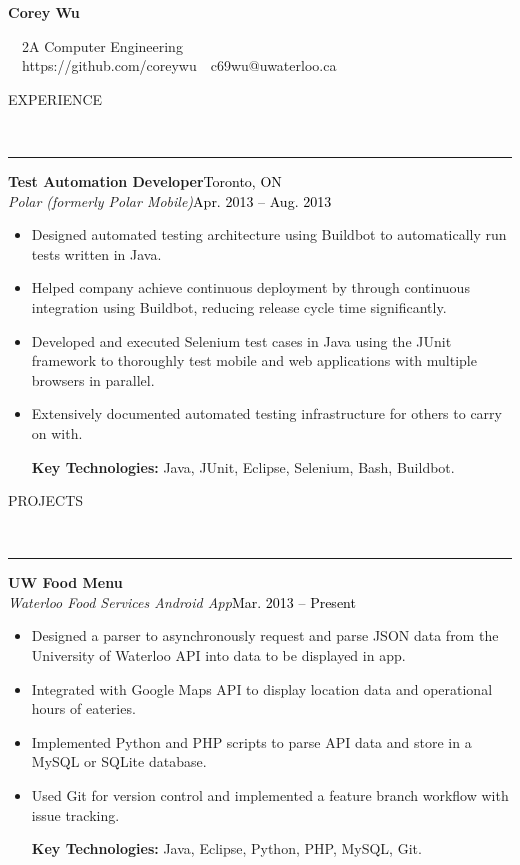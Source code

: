 \documentclass[11pt, letterpaper, oneside]{article}
\makeatletter
\newcommand{\name}{Corey Wu}
\newcommand{\program}{2A Computer Engineering}
\newcommand{\github}{https://github.com/coreywu}
\newcommand{\email}{c69wu@uwaterloo.ca}
\newcommand{\HRule}[2]{\textcolor{#1}{\rule{\linewidth}{#2}}}
\newcommand{\sectiontitle}[1]{\begin{minipage}{\textwidth}\vspace{-7.5pt}\begin{flushleft}\hspace{-20.5pt}\vspace{-25pt}
\Large\MakeUppercase{#1}\end{flushleft}\end{minipage}\\\HRule{black}{0.15mm}\vspace{\baselineskip}}
\newenvironment{ressection}[1]{
  \sectiontitle{#1}}
  {\vspace{-\baselineskip}}
\newcommand{\resentryheader}[4]{
    \vspace{-5pt}
    \textbf{#1}\hspace{\stretch{1}}\textcolor{black}{#3}\\
    \textit{#2}\hspace{\stretch{1}}\textcolor{black}{#4}\\
}
\newcommand{\resitem}[1]{
    \vspace{2pt}
    \item \begin{flushleft} #1 \end{flushleft}
}
\newenvironment{resentry}[4]{
  \begin{minipage}{\textwidth}
    \resentryheader{#1}{#2}{#3}{#4}
        \vspace{-\baselineskip}
    \begin{itemize}[noitemsep,nolistsep]
}{
    \end{itemize}
        \vspace{\baselineskip}
        \end{minipage}
}
\makeatother
\begin{document}
\begin{center}
{\Huge \textbf{\name}}

\ \ {\Large{\program}} \\
\ \ \github \ \textbullet \ \email \ \
\end{center}

\begin{ressection}{Experience}
  \begin{resentry}{Test Automation Developer}{Polar (formerly Polar Mobile)}{Toronto, ON}{Apr. 2013 -- Aug. 2013}
    \resitem{Designed automated testing architecture using Buildbot to automatically run tests written in Java.}
    \resitem{Helped company achieve continuous deployment by through continuous integration using Buildbot, reducing release cycle time significantly.}
    \resitem{Developed and executed Selenium test cases in Java using the JUnit framework to thoroughly test mobile and web applications with multiple browsers in parallel.}
    \resitem{Extensively documented automated testing infrastructure for others to carry on with.}
    \vspace{4pt} \hspace{-15pt}
    \textbf{Key Technologies:} Java, JUnit, Eclipse, Selenium, Bash, Buildbot.
  \end{resentry}
\end{ressection}

\begin{ressection}{Projects}
  \begin{resentry}{UW Food Menu}{Waterloo Food Services Android App}{}{Mar. 2013 -- Present}
    \resitem{Designed a parser to asynchronously request and parse JSON data from the University of Waterloo API into data to be displayed in app.}
    \resitem{Integrated with Google Maps API to display location data and operational hours of eateries.}
    \resitem{Implemented Python and PHP scripts to parse API data and store in a MySQL or SQLite database.}
    \resitem{Used Git for version control and implemented a feature branch workflow with issue tracking.}
    \vspace{4pt} \hspace{-15pt}
    \textbf{Key Technologies:} Java, Eclipse, Python, PHP, MySQL, Git.
  \end{resentry}
\end{ressection}
\end{document}
